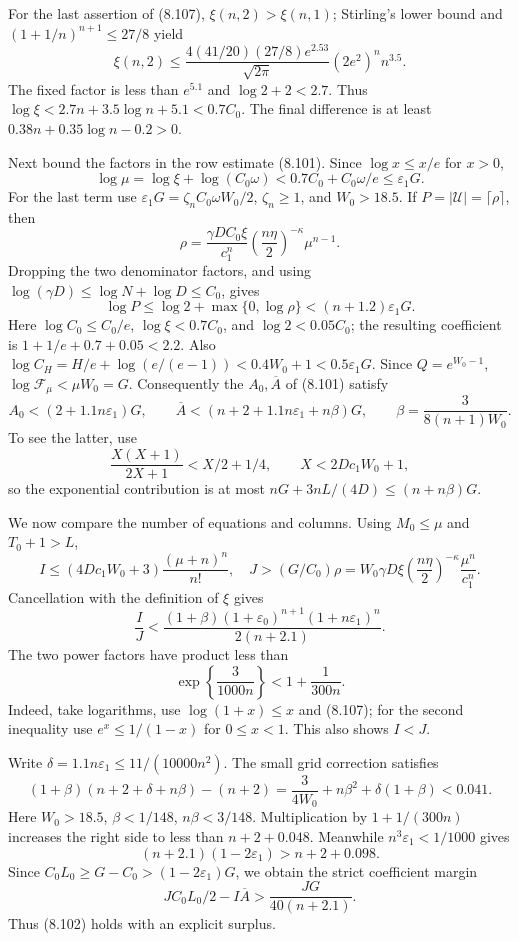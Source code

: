 \documentclass[
  11pt,
  a4paper,
]{article}
\begin{document}
For the last assertion of (8.107), \(\xi(n,2)>\xi(n,1)\); Stirling's
lower bound and \((1+1/n)^{n+1}\le27/8\) yield \[
\xi(n,2)\le
\frac{4(41/20)(27/8)e^{2.53}}{\sqrt{2\pi}}
(2e^2)^nn^{3.5}.
\] The fixed factor is less than \(e^{5.1}\) and \(\log2+2<2.7\). Thus
\(\log\xi<2.7n+3.5\log n+5.1<0.7C_0\). The final difference is at least
\(0.38n+0.35\log n-0.2>0\).

Next bound the factors in the row estimate (8.101). Since
\(\log x\le x/e\) for \(x>0\), \[
\log\mu=\log\xi+\log(C_0\omega)
<0.7C_0+C_0\omega/e\le\varepsilon_1G.
\] For the last term use \(\varepsilon_1G=\zeta_nC_0\omega W_0/2\),
\(\zeta_n\ge1\), and \(W_0>18.5\). If
\(P=|\mathcal U|=\lceil\rho\rceil\), then \[
\rho=\frac{\gamma DC_0\xi}{c_1^n}
\left(\frac{n\eta}2\right)^{-\kappa}\mu^{n-1}.
\] Dropping the two denominator factors, and using
\(\log(\gamma D)\le\log N+\log D\le C_0\), gives \[
\log P\le\log2+\max\{0,\log\rho\}
<(n+1.2)\varepsilon_1G.
\] Here \(\log C_0\le C_0/e\), \(\log\xi<0.7C_0\), and
\(\log2<0.05C_0\); the resulting coefficient is \(1+1/e+0.7+0.05<2.2\).
Also \(\log C_H=H/e+\log(e/(e-1))<
0.4W_0+1<0.5\varepsilon_1G\). Since \(Q=e^{W_0-1}\),
\(\log\mathcal F_\mu<\mu W_0=G\). Consequently the \(A_0,\overline A\)
of (8.101) satisfy \[
A_0<(2+1.1n\varepsilon_1)G,\qquad
\overline A<(n+2+1.1n\varepsilon_1+n\beta)G,
\qquad \beta=\frac3{8(n+1)W_0}.
\] To see the latter, use \[
\frac{X(X+1)}{2X+1}<X/2+1/4,\qquad
X<2Dc_1W_0+1,
\] so the exponential contribution is at most
\(nG+3nL/(4D)\le(n+n\beta)G\).

We now compare the number of equations and columns. Using \(M_0\le\mu\)
and \(T_0+1>L\), \[
I\le(4Dc_1W_0+3)\frac{(\mu+n)^n}{n!},
\quad
J>(G/C_0)\rho
=W_0\gamma D\xi
\left(\frac{n\eta}2\right)^{-\kappa}
\frac{\mu^n}{c_1^n}.
\] Cancellation with the definition of \(\xi\) gives \[
\frac IJ<
\frac{(1+\beta)(1+\varepsilon_0)^{n+1}
(1+n\varepsilon_1)^n}{2(n+2.1)}.
\] The two power factors have product less than \[
\exp\left\{\frac3{1000n}\right\}
<1+\frac1{300n}.
\] Indeed, take logarithms, use \(\log(1+x)\le x\) and (8.107); for the
second inequality use \(e^x\le1/(1-x)\) for \(0\le x<1\). This also
shows \(I<J\).

Write \(\delta=1.1n\varepsilon_1\le11/(10000n^2)\). The small grid
correction satisfies \[
(1+\beta)(n+2+\delta+n\beta)-(n+2)
=\frac3{4W_0}+n\beta^2+\delta(1+\beta)<0.041.
\] Here \(W_0>18.5\), \(\beta<1/148\), \(n\beta<3/148\). Multiplication
by \(1+1/(300n)\) increases the right side to less than \(n+2+0.048\).
Meanwhile \(n^3\varepsilon_1<1/1000\) gives \[
(n+2.1)(1-2\varepsilon_1)>n+2+0.098.
\] Since \(C_0L_0\ge G-C_0>(1-2\varepsilon_1)G\), we obtain the strict
coefficient margin \[
JC_0L_0/2-I\overline A>
\frac{JG}{40(n+2.1)}.
\tag{8.108}
\] Thus (8.102) holds with an explicit surplus.
\end{document}
